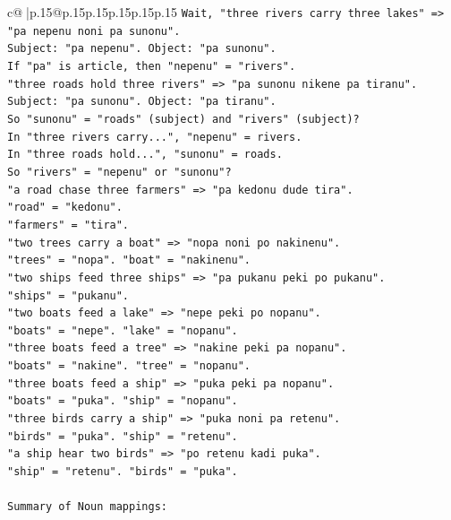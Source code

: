 \documentclass{article}
\begin{document}
{\begin{supertabular}{c@{$\;$}|p{.15\linewidth}@{}p{.15\linewidth}p{.15\linewidth}p{.15\linewidth}p{.15\linewidth}p{.15\linewidth}}
{{{\texttt{Wait, "three rivers carry three lakes" => "pa nepenu noni pa sunonu".} \\
\texttt{Subject: "pa nepenu". Object: "pa sunonu".} \\
\texttt{If "pa" is article, then "nepenu" = "rivers".} \\
\texttt{"three roads hold three rivers" => "pa sunonu nikene pa tiranu".} \\
\texttt{Subject: "pa sunonu". Object: "pa tiranu".} \\
\texttt{So "sunonu" = "roads" (subject) and "rivers" (subject)?} \\
\texttt{In "three rivers carry...", "nepenu" = rivers.} \\
\texttt{In "three roads hold...", "sunonu" = roads.} \\
\texttt{So "rivers" = "nepenu" or "sunonu"?} \\
\texttt{"a road chase three farmers" => "pa kedonu dude tira".} \\
\texttt{"road" = "kedonu".} \\
\texttt{"farmers" = "tira".} \\
\texttt{"two trees carry a boat" => "nopa noni po nakinenu".} \\
\texttt{"trees" = "nopa". "boat" = "nakinenu".} \\
\texttt{"two ships feed three ships" => "pa pukanu peki po pukanu".} \\
\texttt{"ships" = "pukanu".} \\
\texttt{"two boats feed a lake" => "nepe peki po nopanu".} \\
\texttt{"boats" = "nepe". "lake" = "nopanu".} \\
\texttt{"three boats feed a tree" => "nakine peki pa nopanu".} \\
\texttt{"boats" = "nakine". "tree" = "nopanu".} \\
\texttt{"three boats feed a ship" => "puka peki pa nopanu".} \\
\texttt{"boats" = "puka". "ship" = "nopanu".} \\
\texttt{"three birds carry a ship" => "puka noni pa retenu".} \\
\texttt{"birds" = "puka". "ship" = "retenu".} \\
\texttt{"a ship hear two birds" => "po retenu kadi puka".} \\
\texttt{"ship" = "retenu". "birds" = "puka".} \\
\\ 
\texttt{Summary of Noun mappings:} \\
}}}
\end{supertabular}}
\end{document}
